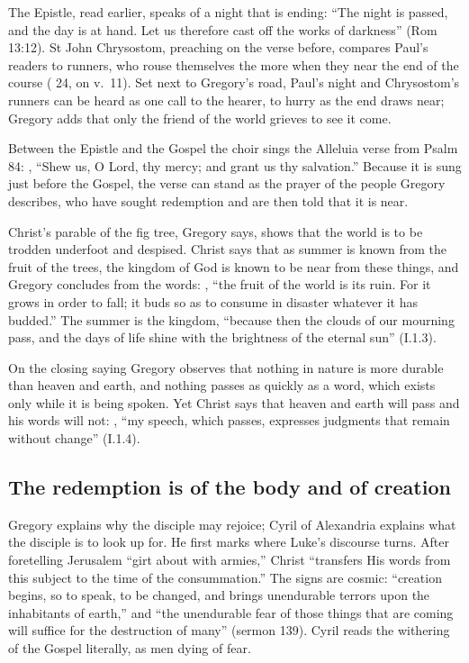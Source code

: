 The Epistle, read earlier, speaks of a night that is ending: ``The night is
passed, and the day is at hand. Let us therefore cast off the works of
darkness'' (Rom 13:12). St John Chrysostom, preaching on the verse before,
compares Paul's readers to runners, who rouse themselves the more when they
near the end of the course ( 24, on v.~11). Set next
to Gregory's road, Paul's night and Chrysostom's runners can be heard as one
call to the hearer, to hurry as the end draws near; Gregory adds that only the
friend of the world grieves to see it come.

Between the Epistle and the Gospel the choir sings the Alleluia verse from
Psalm 84: , ``Shew us, O Lord, thy mercy; and grant us thy salvation.'' Because
it is sung just before the Gospel, the verse can stand as the prayer of the
people Gregory describes, who have sought redemption and are then told that it
is near.

Christ's parable of the fig tree, Gregory says, shows that the world is to be
trodden underfoot and despised. Christ says that as summer is known from the
fruit of the trees, the kingdom of God is known to be near from these things,
and Gregory concludes from the words:
, ``the fruit of the world is
its ruin. For it grows in order to fall; it buds so as to consume in disaster
whatever it has budded.'' The summer is the kingdom, ``because then the
clouds of our mourning pass, and the days of life shine with the brightness
of the eternal sun'' (I.1.3).

On the closing saying Gregory observes that nothing in nature is more
durable than heaven and earth, and nothing passes as quickly as a word, which
exists only while it is being spoken. Yet Christ says that heaven and earth
will pass and his words will not: , ``my speech, which passes, expresses
judgments that remain without change'' (I.1.4).

\subsection{The redemption is of the body and of creation}

Gregory explains why the disciple may rejoice; Cyril of Alexandria explains
what the disciple is to look up for. He first marks where Luke's discourse
turns. After foretelling Jerusalem ``girt about with armies,'' Christ
``transfers His words from this subject to the time of the consummation.''
The signs are cosmic: ``creation begins, so to speak, to be changed, and
brings unendurable terrors upon the inhabitants of earth,'' and ``the
unendurable fear of those things that are coming will suffice for the
destruction of many'' (sermon 139). Cyril reads the withering of the Gospel
literally, as men dying of fear.

